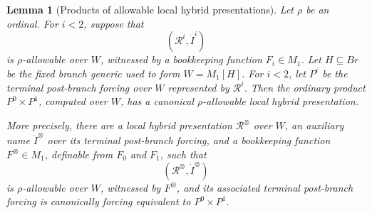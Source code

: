 \documentclass[a4paper,11pt]{article}
\newtheorem{lemma}[theorem]{Lemma}
\begin{document}
\begin{lemma}[Products of allowable local hybrid presentations]
\label{lem:rho-allowable-products-local}
Let \(\rho\) be an ordinal.  For \(i<2\), suppose that
\[
   (\mathcal R^i,\dot I^i)
\]
is \(\rho\)-allowable over \(W\), witnessed by a bookkeeping function
\(F_i\in M_1\).  Let \(H\subseteq Br\) be the fixed branch generic used to form
\(W=M_1[H]\).  For \(i<2\), let \(P^i\) be the terminal post-branch forcing over
\(W\) represented by \(\mathcal R^i\).  Then the ordinary product
\(P^0\times P^1\), computed over \(W\), has a canonical \(\rho\)-allowable local
hybrid presentation.

More precisely, there are a local hybrid presentation \(\mathcal R^\otimes\) over
\(W\), an auxiliary name \(\dot I^\otimes\) over its terminal post-branch forcing,
and a bookkeeping function \(F^\otimes\in M_1\), definable from \(F_0\) and
\(F_1\), such that
\[
   (\mathcal R^\otimes,\dot I^\otimes)
\]
is \(\rho\)-allowable over \(W\), witnessed by \(F^\otimes\), and its associated
terminal post-branch forcing is canonically forcing equivalent to
\(P^0\times P^1\).
\end{lemma}
\end{document}
